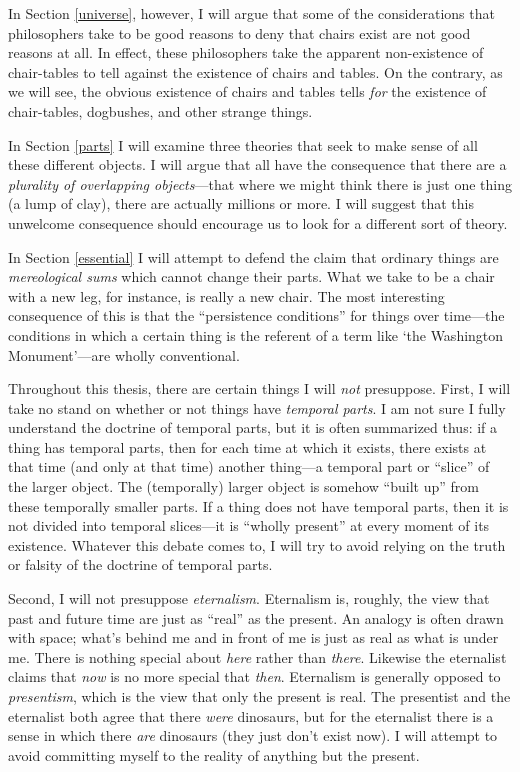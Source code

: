\documentclass[11pt]{article}
\begin{document}
\begin{spacing}{1.5}
In Section \ref{universe}, however, I will argue that some of the
considerations that philosophers take to be good reasons to deny that
chairs exist are not good reasons at all.  In effect, these
philosophers take the apparent non-existence of chair-tables to tell
against the existence of chairs and tables.  On the contrary, as we
will see, the obvious existence of chairs and tables tells {\em for}
the existence of chair-tables, dogbushes, and other strange things.

In Section \ref{parts} I will examine three theories that seek to make
sense of all these different objects.  I will argue that all have the
consequence that there are a {\em plurality of overlapping
  objects}---that where we might think there is just one thing (a lump
of clay), there are actually millions or more.  I will suggest that
this unwelcome consequence should encourage us to look for a different
sort of theory.

In Section \ref{essential} I will attempt to defend the claim that
ordinary things are {\em mereological sums} which cannot change their
parts.  What we take to be a chair with a new leg, for instance, is
really a new chair.  The most interesting consequence of this is that
the ``persistence conditions'' for things over time---the conditions
in which a certain thing is the referent of a term like `the
Washington Monument'---are wholly conventional.

Throughout this thesis, there are certain things I will {\em not}
presuppose.  First, I will take no stand on whether or not things have
{\em temporal parts}.  I am not sure I fully understand the doctrine
of temporal parts, but it is often summarized thus: if a thing has
temporal parts, then for each time at which it exists, there exists at
that time (and only at that time) another thing---a temporal part or
``slice'' of the larger object.  The (temporally) larger object is
somehow ``built up'' from these temporally smaller parts.  If a thing
does not have temporal parts, then it is not divided into temporal
slices---it is ``wholly present'' at every moment of its existence.
Whatever this debate comes to, I will try to avoid relying on the
truth or falsity of the doctrine of temporal parts.

Second, I will not presuppose {\em eternalism}.  Eternalism is,
roughly, the view that past and future time are just as ``real'' as
the present.  An analogy is often drawn with space; what's behind me
and in front of me is just as real as what is under me.  There is
nothing special about {\em here} rather than {\em there}.  Likewise
the eternalist claims that {\em now} is no more special that {\em
  then}.  Eternalism is generally opposed to {\em presentism}, which
is the view that only the present is real.  The presentist and the
eternalist both agree that there {\em were} dinosaurs, but for the
eternalist there is a sense in which there {\em are} dinosaurs (they
just don't exist now).  I will attempt to avoid committing myself to
the reality of anything but the present.

\ifstandalone
\end{spacing}


\fi
\end{document}
